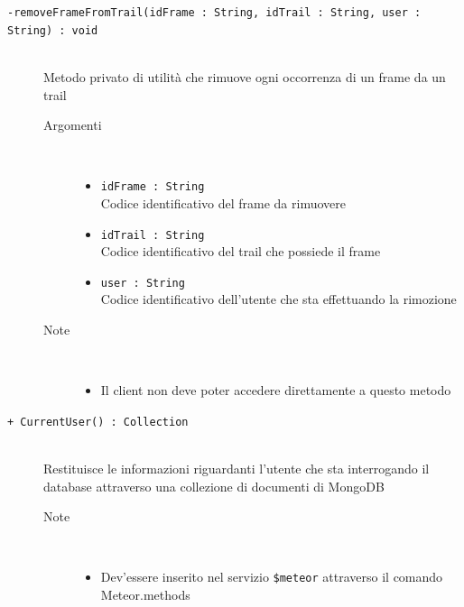 \begin{description}
	\begin{description}
		\item[\texttt{-removeFrameFromTrail(idFrame : String, idTrail : String, user :  String)	: void		}] \hfill \\
			Metodo privato di utilità che rimuove ogni occorrenza di un frame da un trail
			
		\begin{description}
			\item[Argomenti] \hfill \\
				\begin{itemize}
				
					\item \texttt{idFrame : String			} \hfill \\
					Codice identificativo del frame da rimuovere
					\item \texttt{idTrail : String			} \hfill \\
					Codice identificativo del trail che possiede il frame
					\item \texttt{user : String			} \hfill \\
					Codice identificativo dell'utente che sta effettuando la rimozione
					
				\end{itemize}
			\item[Note] \hfill \\
			\begin{itemize}
					\item Il client non deve poter accedere direttamente a questo metodo
				\end{itemize}
		\end{description}
	\end{description}

	\begin{description}
		\item[\texttt{+ CurrentUser() : Collection			}] \hfill \\
			Restituisce le informazioni riguardanti l'utente che sta interrogando il database attraverso una collezione di documenti di MongoDB
			
		\begin{description}
			
			\item[Note] \hfill \\
			\begin{itemize}
					\item Dev'essere inserito nel servizio \texttt{\$meteor} attraverso il comando Meteor.methods
				\end{itemize}
		\end{description}
	\end{description}


\end{description}
